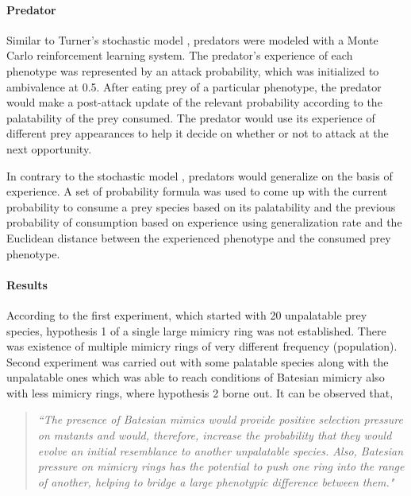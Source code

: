 \paragraph{Predator}
Similar to Turner's stochastic model \cite{turner_et_al1984},  predators were modeled with a Monte Carlo reinforcement learning system. The predator's experience of each phenotype was represented by an attack probability, which was initialized to ambivalence at 0.5. After eating prey of a particular phenotype, the predator would make a post-attack update of the relevant probability according to the palatability of the prey consumed. The predator would use its experience of different prey appearances to help it decide on whether or not to attack at the next opportunity.

In contrary to the stochastic model \cite{turner_et_al1984},  predators would generalize on the basis of experience. A set of probability formula was used to come up with the current probability to consume a prey species based on its palatability and the previous probability of consumption based on experience using generalization rate and the Euclidean distance between the experienced phenotype and the consumed prey phenotype. 

\paragraph{Results}
According to the first experiment, which started with 20 unpalatable prey species, hypothesis 1 of a single large mimicry ring was not established. There was existence of multiple mimicry rings of very different frequency (population). Second experiment was carried out with some palatable species along with the unpalatable ones which was able to reach conditions of Batesian mimicry also with less mimicry rings, where hypothesis 2 borne out. It can be observed that,

\begin{quote}
\textsl{``The presence of Batesian mimics would provide positive selection pressure on mutants and would, therefore, increase the probability that they would evolve an initial resemblance to another unpalatable species. Also, Batesian pressure on mimicry rings has the potential to push one ring into the range of another, helping to bridge a large phenotypic difference between them." \cite{franks2003}}
\end{quote}

